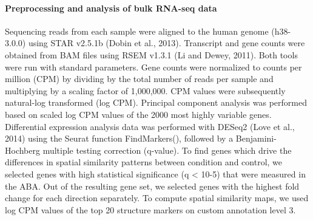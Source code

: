 \paragraph{Preprocessing and analysis of bulk RNA-seq data}
Sequencing reads from each sample were aligned to the human genome (h38-3.0.0) using STAR v2.5.1b (Dobin et al., 2013). Transcript and gene counts were obtained from BAM files using RSEM v1.3.1 (Li and Dewey, 2011). Both tools were run with standard parameters. Gene counts were normalized to counts per million (CPM) by dividing by the total number of reads per sample and multiplying by a scaling factor of 1,000,000. CPM values were subsequently natural-log transformed (log CPM). Principal component analysis was performed based on scaled log CPM values of the 2000 most highly variable genes. Differential expression analysis data was performed with DESeq2 (Love et al., 2014) using the Seurat function FindMarkers(), followed by a Benjamini-Hochberg multiple testing correction (q-value). To find genes which drive the differences in spatial similarity patterns between condition and control, we selected genes with high statistical significance (q < 10-5) that were measured in the ABA. Out of the resulting gene set, we selected genes with the highest fold change for each direction separately. To compute spatial similarity maps, we used log CPM values of the top 20 structure markers on custom annotation level 3. 

